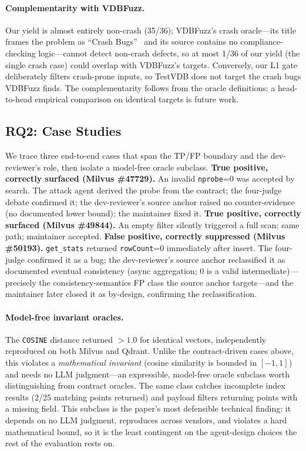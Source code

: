 \documentclass[sigconf]{acmart}
\begin{document}
\paragraph{Complementarity with VDBFuzz.} Our yield is almost entirely non-crash (35/36); VDBFuzz's crash oracle---its title frames the problem as ``Crash Bugs''~\cite{vdbfuzz26} and its source contains no compliance-checking logic---cannot detect non-crash defects, so at most 1/36 of our yield (the single crash case) could overlap with VDBFuzz's targets. Conversely, our L1 gate deliberately filters crash-prone inputs, so TestVDB does not target the crash bugs VDBFuzz finds. The complementarity follows from the oracle definitions; a head-to-head empirical comparison on identical targets is future work.

\subsection{RQ2: Case Studies}
We trace three end-to-end cases that span the TP/FP boundary and the dev-reviewer's role, then isolate a model-free oracle subclass.
\textbf{True positive, correctly surfaced (Milvus \#47729).} An invalid \texttt{nprobe}=0 was accepted by search. The attack agent derived the probe from the contract; the four-judge debate confirmed it; the dev-reviewer's source anchor raised no counter-evidence (no documented lower bound); the maintainer fixed it.
\textbf{True positive, correctly surfaced (Milvus \#49844).} An empty filter silently triggered a full scan; same path; maintainer accepted.
\textbf{False positive, correctly suppressed (Milvus \#50193).} \texttt{get\_stats} returned \texttt{rowCount}=0 immediately after insert. The four-judge confirmed it as a bug; the dev-reviewer's source anchor reclassified it as documented eventual consistency (async aggregation; 0 is a valid intermediate)---precisely the consistency-semantics FP class the source anchor targets---and the maintainer later closed it as by-design, confirming the reclassification.
\paragraph{Model-free invariant oracles.} The \texttt{COSINE} distance returned $>1.0$ for identical vectors, independently reproduced on both Milvus and Qdrant. Unlike the contract-driven cases above, this violates a \emph{mathematical invariant} (cosine similarity is bounded in $[-1,1]$) and needs no LLM judgment---an expressible, model-free oracle subclass worth distinguishing from contract oracles. The same class catches incomplete index results (2/25 matching points returned) and payload filters returning points with a missing field. This subclass is the paper's most defensible technical finding: it depends on no LLM judgment, reproduces across vendors, and violates a hard mathematical bound, so it is the least contingent on the agent-design choices the rest of the evaluation rests on.
\end{document}

